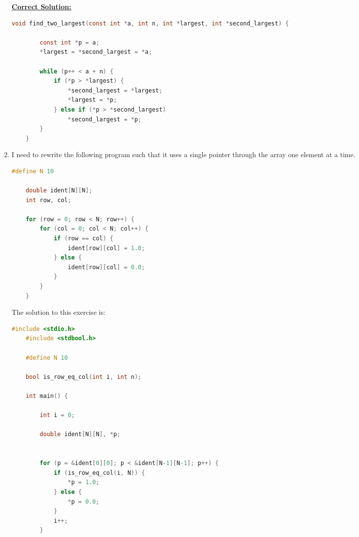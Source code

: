 \documentclass[12pt]{article}
\begin{document}
\begin{enumerate}[1.]
    \bigskip

    \begin{mdframed}

    \underline{\textbf{Correct Solution:}}

    \bigskip

\begin{lstlisting}[language=c]
    void find_two_largest(const int *a, int n, int *largest, int *second_largest) {

        const int *p = a;
        *largest = *second_largest = *a;

        while (p++ < a + n) {
            if (*p > *largest) {
                *second_largest = *largest;
                *largest = *p;
            } else if (*p > *second_largest)
                *second_largest = *p;
        }
    }
\end{lstlisting}

    \end{mdframed}

    \item

    I need to rewrite the following program such that it uses a single pointer through
    the array one element at a time.

    \bigskip

\begin{lstlisting}[language=c]
    #define N 10

    double ident[N][N];
    int row, col;

    for (row = 0; row < N; row++) {
        for (col = 0; col < N; col++) {
            if (row == col) {
                ident[row][col] = 1.0;
            } else {
                ident[row][col] = 0.0;
            }
        }
    }
\end{lstlisting}

    \bigskip

    The solution to this exercise is:

    \bigskip

\begin{lstlisting}[language=c]
    #include <stdio.h>
    #include <stdbool.h>

    #define N 10

    bool is_row_eq_col(int i, int n);

    int main() {

        int i = 0;

        double ident[N][N], *p;


        for (p = &ident[0][0]; p < &ident[N-1][N-1]; p++) {
            if (is_row_eq_col(i, N)) {
                *p = 1.0;
            } else {
                *p = 0.0;
            }
            i++;
        }



\end{lstlisting}
\end{enumerate}
\end{document}
